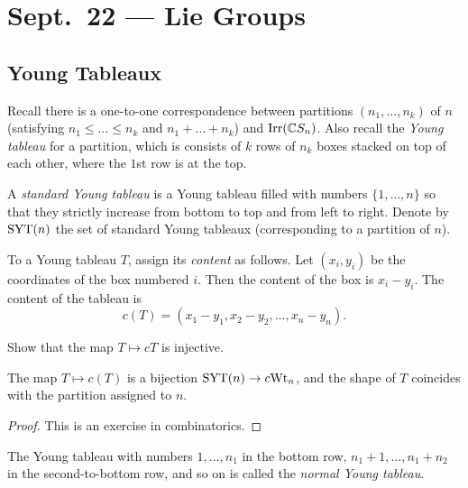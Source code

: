 \chapter{Sept.~22 --- Lie Groups}

\section{Young Tableaux}

\begin{remark}
  Recall there is a one-to-one
  correspondence between partitions
  $(n_1, \dots, n_k)$ of $n$ (satisfying
  $n_1 \le \dots \le n_k$ and
  $n_1 + \dots + n_k$) and
  $\operatorname{Irr}(\mathbb{C} S_n)$. Also
  recall the \emph{Young tableau}
  for a partition, which is consists
  of $k$ rows of $n_k$
  boxes stacked on top of each other,
  where the $1$st row is at the top.
\end{remark}

\begin{definition}
  A \emph{standard Young tableau}
  is a Young tableau
  filled with numbers $\{1, \dots, n\}$
  so that they strictly increase
  from bottom to top and from left to right.
  Denote by $\operatorname{SYT}(n)$ the set of
  standard Young tableaux (corresponding
  to a partition of $n$).
\end{definition}

\begin{definition}
  To a Young tableau $T$, assign its
  \emph{content} as follows. Let
  $(x_i, y_i)$ be the coordinates
  of the box numbered $i$. Then the
  content of the box is $x_i - y_i$.
  The content of the tableau is
  \[
    c(T) = (x_1 - y_1, x_2 - y_2, \dots, x_n - y_n).
  \]
\end{definition}

\begin{exercise}
  Show that the map $T \mapsto cT$
  is injective.
\end{exercise}

\begin{prop}
  The map $T \mapsto c(T)$ is a bijection
  $\operatorname{SYT}(n) \to c{\operatorname{Wt}_n}$, and the shape of
  $T$ coincides with the
  partition assigned to $n$.
\end{prop}

\begin{proof}
  This is an exercise in combinatorics.
\end{proof}

\begin{definition}
  The Young tableau with numbers
  $1, \dots, n_1$ in the bottom row,
  $n_1 + 1, \dots, n_1 + n_2$ in the
  second-to-bottom row, and so on
  is called the \emph{normal Young tableau}.
\end{definition}

